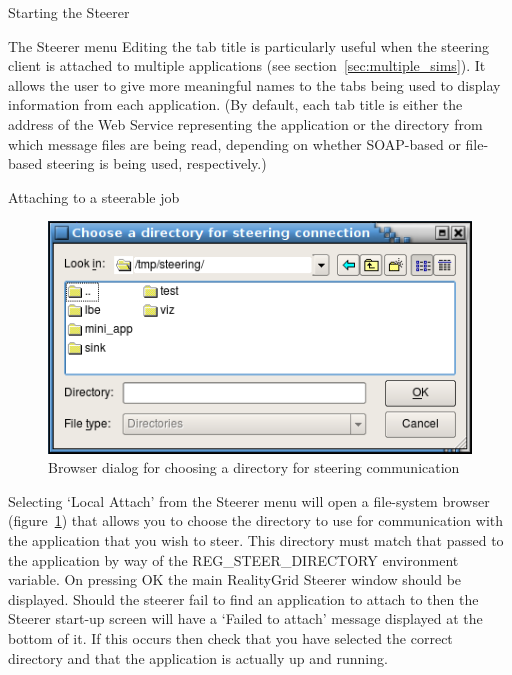 \documentclass[a4paper,twoside]{article}
\begin{document}
\begin{section}{Starting the Steerer}
\begin{subsection}{The Steerer menu}
Editing the tab title is particularly useful when the steering client
is attached to multiple applications (see
section~\ref{sec:multiple_sims}).  It allows the user to give more
meaningful names to the tabs being used to display information from
each application.  (By default, each tab title is either the address
of the Web Service representing the application or the directory from
which message files are being read, depending on whether SOAP-based or
file-based steering is being used, respectively.)

\end{subsection}

\begin{subsection}{Attaching to a steerable job}

\begin{figure}
\centerline{\includegraphics{dir_browser.png}}
\caption{Browser dialog for choosing a directory for steering communication}
\label{fig:dir_browser}
\end{figure}

Selecting `Local Attach' from the Steerer menu will open a file-system
browser (figure~\ref{fig:dir_browser}) that allows you to choose the
directory to use for communication with the application that you wish
to steer.  This directory must match that passed to the application by
way of the REG\_\-STEER\_\-DIRECTORY environment variable.  On
pressing OK the main RealityGrid Steerer window should be displayed.
Should the steerer fail to find an application to attach to then the
Steerer start-up screen will have a `Failed to attach' message
displayed at the bottom of it.  If this occurs then check that you
have selected the correct directory and that the application is
actually up and running.


\end{subsection}
\end{section}
\end{document}
